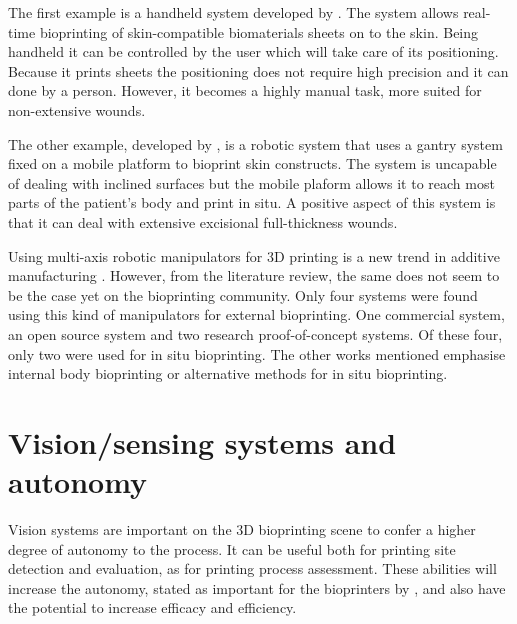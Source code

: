 The first example is a handheld system developed by \citeauthor{Hakimi2018_handheld_skin_printer}\cite{Hakimi2018_handheld_skin_printer}. The system allows real-time bioprinting of skin-compatible biomaterials sheets on to the skin. Being handheld it can be controlled by the user which will take care of its positioning. Because it prints sheets the positioning does not require high precision and it can done by a person. However, it becomes a highly manual task, more suited for non-extensive wounds.

The other example, developed by \citeauthor{Albanna2019_in_situ_bioprinting_mobile_gantry}\cite{Albanna2019_in_situ_bioprinting_mobile_gantry}, is a robotic system that uses a gantry system fixed on a mobile platform to bioprint skin constructs. The system is uncapable of dealing with inclined surfaces but the mobile plaform allows it to reach most parts of the patient's body and print in situ. A positive aspect of this system is that it can deal with extensive excisional full-thickness wounds.\bigskip

Using multi-axis robotic manipulators for 3D printing is a new trend in additive manufacturing \cite{Urhal2019_robot_assisted_additive_manufacturing_review}. However, from the literature review, the same does not seem to be the case yet on the bioprinting community. Only four systems were found using this kind of manipulators for external bioprinting. One commercial system, an open source system and two research proof-of-concept systems. Of these four, only two were used for in situ bioprinting. The other works mentioned emphasise internal body bioprinting or alternative methods for in situ bioprinting.


\section{Vision/sensing systems and autonomy}
\label{sec:vision_sensing_systems_and_autonomy}

Vision systems are important on the 3D bioprinting scene to confer a higher degree of autonomy to the process. It can be useful both for printing site detection and evaluation, as for printing process assessment. These abilities will increase the autonomy, stated as important for the bioprinters by \citeauthor{Ozbolat2017_evaluation_bioprinter_tech}\cite{Ozbolat2017_evaluation_bioprinter_tech}, and also have the potential to increase efficacy and efficiency.\bigskip

